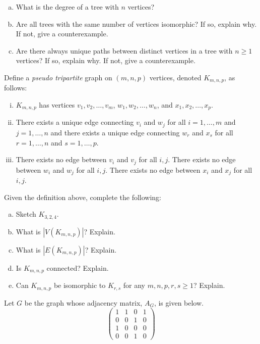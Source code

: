 \documentclass[12pt,letterpaper]{exam}
\begin{document}
\begin{questions}
\begin{enumerate}[(a)]
	\item What is the degree of a tree with $n$ vertices? 
	\item Are all trees with the same number of vertices isomorphic? If so, explain why. If not, give a counterexample. 
	\item Are there always unique paths between distinct vertices in a tree with $n \geq 1$ vertices? If so, explain why. If not, give a counterexample. 
	\end{enumerate}



\newpage



\newpage
\question[10] Define a \textit{pseudo tripartite} graph on $(m, n, p)$ vertices, denoted $K_{m, n, p}$, as follows:
	\begin{enumerate}[(i)]
	\item $K_{m,n,p}$ has vertices $v_1, v_2, \ldots, v_m$, $w_1, w_2, \ldots, w_n$, and $x_1, x_2, \ldots, x_p$.
	\item There exists a unique edge connecting $v_i$ and $w_j$ for all $i= 1, \ldots, m$ and $j= 1, \ldots, n$ and there exists a unique edge connecting $w_r$ and $x_s$ for all $r= 1, \ldots, n$ and $s= 1, \ldots, p$. 
	\item There exists no edge between $v_i$ and $v_j$ for all $i, j$. There exists no edge between $w_i$ and $w_j$ for all $i, j$. There exists no edge between $x_i$ and $x_j$ for all $i, j$. 
	\end{enumerate}

Given the definition above, complete the following:
\begin{enumerate}[(a)]
\item Sketch $K_{3, 2, 4}$.
\item What is $|V(K_{m, n, p})|$? Explain. 
\item What is $|E(K_{m, n, p})|$? Explain. 
\item Is $K_{m, n, p}$ connected? Explain. 
\item Can $K_{m, n, p}$ be isomorphic to $K_{r, s}$ for any $m, n, p, r, s \geq 1$? Explain. 
\end{enumerate}



\newpage



\newpage
\question[10] Let $G$ be the graph whose adjacency matrix, $A_G$, is given below.
	\[
	\begin{pmatrix}
	1 & 1 & 0 & 1 \\
	0 & 0 & 1 & 0 \\
	1 & 0 & 0 & 0 \\
	0 & 0 & 1 & 0 
	\end{pmatrix}
	\]


\end{questions}
\end{document}
